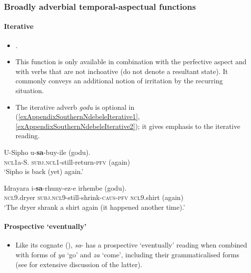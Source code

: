 \subsubsection{Broadly adverbial temporal-aspectual functions}
\paragraph{Iterative}\label{appendixSouthernNdebeleIterative}
\begin{itemize}
	\item \textcite{CranePersohn2021}.
	\item This function is only available in combination with the perfective aspect and with verbs that are not inchoative (do not denote a resultant state). It commonly conveys an additional notion of irritation by the recurring situation.
	\item The iterative adverb \textit{godu} is optional in (\ref{exAppendixSouthernNdebeleIterative1}, \ref{exAppendixSouthernNdebeleIterative2}); it gives emphasis to the iterative reading.
\end{itemize}

\begin{exe}
	\ex\label{exAppendixSouthernNdebeleIterative1}
	\gll U-Sipho u-\textbf{sa}-buy-ile (godu).\\
	\textsc{ncl}1a-S. \textsc{subj}.\textsc{ncl}1-still-return-\textsc{pfv} (again)\\
	\glt \lq Sipho is back (yet) again.' \parencite[244]{CranePersohn2021}
	
	\ex\label{exAppendixSouthernNdebeleIterative2}
	\gll Idrayara i-\textbf{sa}-rhuny-ez-e irhembe (godu).\\
	\textsc{ncl}9.dryer \textsc{subj}.\textsc{ncl}9-still-shrink-\textsc{caus}-\textsc{pfv} \textsc{ncl}9.shirt (again)\\
	\glt \lq The dryer shrank a shirt again (it happened another time).\rq{ }\parencite[244]{CranePersohn2021}
\end{exe}

\paragraph{Prospective \lq eventually\rq{}}\label{appendixSouthernNdebeleProspective}
\begin{itemize}
	\item Like its  cognate (), \mbox{\textit{sa}-} has a prospective \lq eventually' reading when combined with forms of \textit{ya} \lq{}go\rq{ }and \textit{za} \lq come\rq{}, including their grammaticalised forms (see \cite{CraneMabena2019} for extensive discussion of the latter).
\end{itemize}

